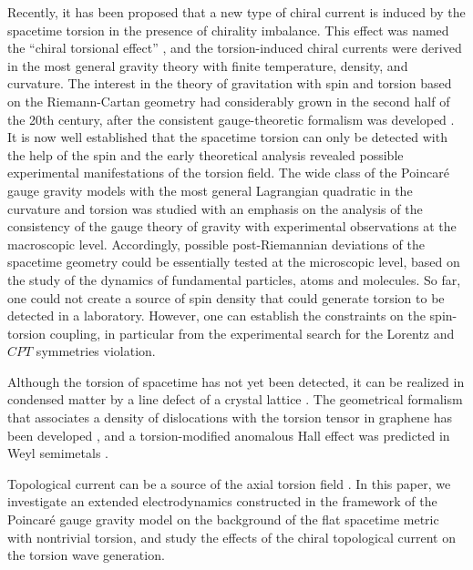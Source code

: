 \documentclass[12pt,prd,showkeys,amsmath,amssymb,nofootinbib]{revtex4-1}
\begin{document}
Recently, it has been proposed that a new type of chiral current is induced by the spacetime torsion in the presence of chirality imbalance. This effect was named the ``chiral torsional effect'' \cite{Khaidukov,PhysRevD.102.016001}, and the torsion-induced chiral currents were derived \cite{PhysRevD.102.016001} in the most general gravity theory with finite temperature, density, and curvature. The interest in the theory of gravitation with spin and torsion based on the Riemann-Cartan geometry had considerably grown in the second half of the 20th century, after the consistent gauge-theoretic formalism was developed \cite{2,10.1063/1.1703702,Trautman:2006fp,PhysRevD.10.1066}. It is now well established that the spacetime torsion can only be detected with the help of the spin \cite{PhysRevD.21.2081,Hehl,Obukhov2015} and the early theoretical analysis \cite{RevModPhys.48.393,Hehl} revealed possible experimental manifestations of the torsion field. The wide class of the Poincar\'e gauge gravity models with the most general Lagrangian quadratic in the curvature and torsion was studied \cite{Poincare2} with an emphasis on the analysis of the consistency of the gauge theory of gravity with experimental observations at the macroscopic level. Accordingly, possible post-Riemannian deviations of the spacetime geometry could be essentially tested at the microscopic level, based on the study of the dynamics of fundamental particles, atoms and molecules. So far, one could not create a source of spin density that could generate torsion to be detected in a laboratory. However, one can establish the constraints on the spin-torsion coupling, in particular from the experimental search for the Lorentz and $CPT$ symmetries violation.

Although the torsion of spacetime has not yet been detected, it can be realized in condensed matter by a line defect of a crystal lattice \cite{PhysRevD.100.054509}. The geometrical formalism that associates a density of dislocations with the torsion tensor in graphene has been developed \cite{DEJUAN2010625}, and a torsion-modified anomalous Hall effect was predicted in Weyl semimetals \cite{PhysRevB.99.155152}.

Topological current can be a source of the axial torsion field \cite{TAO}. In this paper, we investigate an extended electrodynamics constructed in the framework of the Poincar\'e gauge gravity model on the background of the flat spacetime metric with nontrivial torsion, and study the effects of the chiral topological current on the torsion wave generation.
\end{document}
